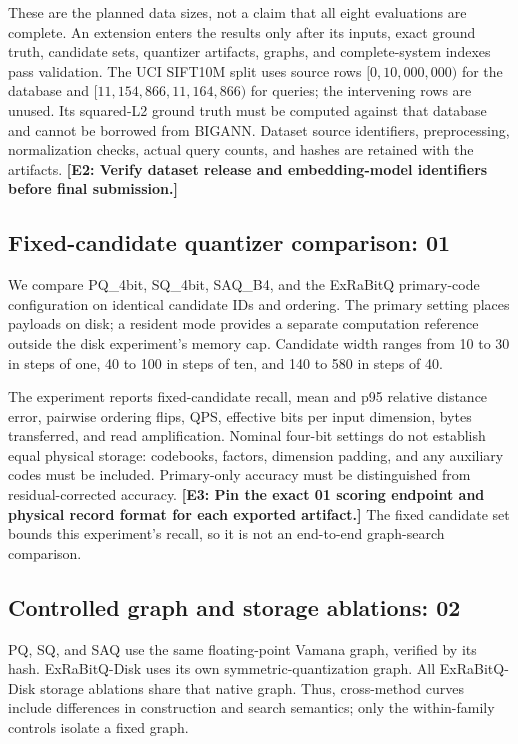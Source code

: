 These are the planned data sizes, not a claim that all eight evaluations are complete. An extension enters the results only after its inputs, exact ground truth, candidate sets, quantizer artifacts, graphs, and complete-system indexes pass validation. The UCI SIFT10M split uses source rows $[0,10{,}000{,}000)$ for the database and $[11{,}154{,}866,11{,}164{,}866)$ for queries; the intervening rows are unused. Its squared-L2 ground truth must be computed against that database and cannot be borrowed from BIGANN. Dataset source identifiers, preprocessing, normalization checks, actual query counts, and hashes are retained with the artifacts. \textbf{[E2: Verify dataset release and embedding-model identifiers before final submission.]}

\subsection{Fixed-candidate quantizer comparison: 01}

We compare PQ\_4bit, SQ\_4bit, SAQ\_B4, and the ExRaBitQ primary-code configuration on identical candidate IDs and ordering. The primary setting places payloads on disk; a resident mode provides a separate computation reference outside the disk experiment's memory cap. Candidate width ranges from 10 to 30 in steps of one, 40 to 100 in steps of ten, and 140 to 580 in steps of 40.

The experiment reports fixed-candidate recall, mean and p95 relative distance error, pairwise ordering flips, QPS, effective bits per input dimension, bytes transferred, and read amplification. Nominal four-bit settings do not establish equal physical storage: codebooks, factors, dimension padding, and any auxiliary codes must be included. Primary-only accuracy must be distinguished from residual-corrected accuracy. \textbf{[E3: Pin the exact 01 scoring endpoint and physical record format for each exported artifact.]} The fixed candidate set bounds this experiment's recall, so it is not an end-to-end graph-search comparison.

\subsection{Controlled graph and storage ablations: 02}

PQ, SQ, and SAQ use the same floating-point Vamana graph, verified by its hash. ExRaBitQ-Disk uses its own symmetric-quantization graph. All ExRaBitQ-Disk storage ablations share that native graph. Thus, cross-method curves include differences in construction and search semantics; only the within-family controls isolate a fixed graph.


